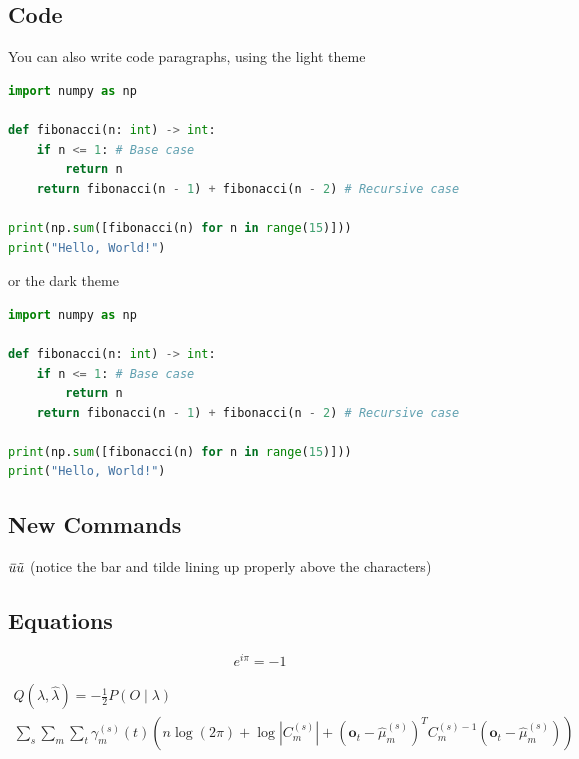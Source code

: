 \subsection{Code}
You can also write code paragraphs, using the light theme

\begin{lstlisting}[language=Python, caption={Sum from 1 to 9. (Light Theme)}]
import numpy as np

def fibonacci(n: int) -> int:
	if n <= 1: # Base case
		return n
	return fibonacci(n - 1) + fibonacci(n - 2) # Recursive case

print(np.sum([fibonacci(n) for n in range(15)]))
print("Hello, World!")
\end{lstlisting}

or the dark theme

\begin{lstlisting}[language=Python, style=dark, caption={Sum from 1 to 9. (Dark Theme)}]
import numpy as np

def fibonacci(n: int) -> int:
	if n <= 1: # Base case
		return n
	return fibonacci(n - 1) + fibonacci(n - 2) # Recursive case

print(np.sum([fibonacci(n) for n in range(15)]))
print("Hello, World!")
\end{lstlisting}

\subsection{New Commands}
${}\mkern3mu\overline{\mkern-3muu}{}\mkern3mu\tilde{\mkern-3muu}$ (notice the bar and tilde lining up properly above the characters)

\subsection{Equations}
\begin{equation}
	e^{i\pi} = -1
\end{equation}

\begin{equation}
	\begin{split}
		Q(\lambda,\hat{\lambda}) = -\frac{1}{2} P{(O \mid \lambda )} \\\sum_s \sum_m \sum_t \gamma_m^{(s)} (t) \left( n \log(2 \pi ) + \log \left| C_m^{(s)} \right| + \left( \mathbf{o}_t - \hat{\mu}_m^{(s)} \right) ^T C_m^{(s)-1} \left(\mathbf{o}_t - \hat{\mu}_m^{(s)}\right) \right)
	\end{split}
\end{equation}